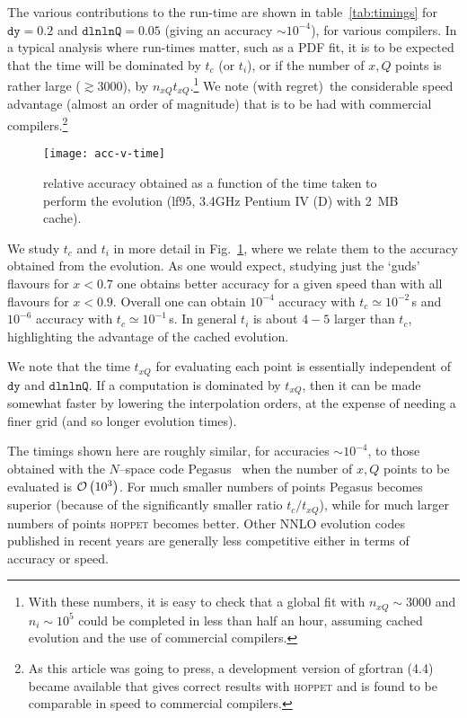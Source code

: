 \documentclass[12pt]{article}
\newcommand{\dy}{\ttt{dy}}
\newcommand{\dlnlnQ}{\ttt{dlnlnQ}}
\newcommand{\hoppet}{\textsc{hoppet}\xspace}
\newcommand{\ttt}[1]{\texttt{#1}}
\newcommand{\order}[1]{{\cal O}\left(#1\right)}
\begin{document}
The various contributions to the run-time are shown in
table~\ref{tab:timings} for $\dy=0.2$ and $\dlnlnQ=0.05$ (giving an
accuracy $\sim 10^{-4}$), for various compilers.  In a typical
analysis where run-times matter, such as a PDF fit, it is to be
expected that the time will be dominated by $t_c$ (or $t_i$), or if
the number of $x,Q$ points is rather large ($\gtrsim 3000$), by
$n_{xQ} t_{xQ}$.\footnote{
With these numbers, it is easy to check that a global fit with
$n_{xQ}\sim 3000$ and $n_i\sim 10^5$ could be completed
in less than half an hour, assuming cached evolution
and the use of commercial compilers.} We note (with regret)\ the
considerable speed advantage (almost an order
of magnitude) that is to be had with commercial
compilers.\footnote{As this article was going to press, a development
  version of gfortran (4.4) became available that gives correct
  results with \hoppet and is found to be comparable in speed to
  commercial compilers.}

\begin{figure}
  \centering
  \texttt{[image: acc-v-time]}%
  \caption{relative accuracy obtained as a function of the time taken
    to perform the evolution (lf95, 3.4GHz Pentium IV (D) with 2~MB
    cache).}
  \label{fig:acc-v-time}
\end{figure}

We study $t_c$ and $t_i$ in more detail in Fig.~\ref{fig:acc-v-time},
where we relate them to the accuracy obtained from the evolution. As
one would expect, studying just the `guds' flavours for $x<0.7$ one
obtains better accuracy for a given speed than with all flavours for
$x<0.9$. Overall one can obtain $10^{-4}$ accuracy with $t_c \simeq
10^{-2}$\,s and $10^{-6}$ accuracy with $t_c \simeq 10^{-1}$\,s. In
general $t_i$ is about $4-5$ larger than $t_c$, highlighting the
advantage of the cached evolution. 

We note that the time $t_{xQ}$ for evaluating each point is
essentially independent of $\dy$ and $\dlnlnQ$. If a computation is
dominated by $t_{xQ}$, then it can be made somewhat faster by
lowering the interpolation orders, at the expense of needing a finer
grid (and so longer evolution times).

The timings shown here are roughly similar, for accuracies $\sim
10^{-4}$, to those obtained with the $N$--space code
Pegasus~\cite{Pegasus} when the number of $x,Q$ points to be
evaluated is $\order{10^3}$. For much smaller numbers of points
Pegasus becomes superior (because of the significantly smaller ratio
$t_c/t_{xQ}$), while for much larger numbers of points \hoppet becomes
better. Other NNLO evolution codes published in recent years 
\cite{Weinzierl:2002mv,coriano,Botje}
 are generally less competitive
either in terms of accuracy or speed.
\end{document}
